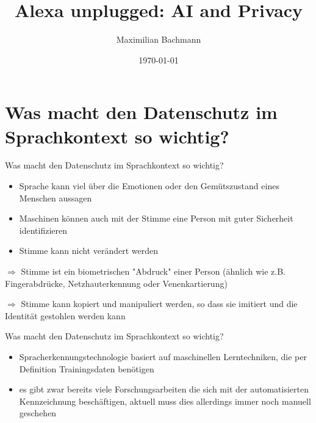 \documentclass[aspectratio=169]{beamer}
\title[Alexa unplugged: AI and Privacy]{Alexa unplugged: AI and Privacy}
\author{Maximilian Bachmann\\}
\date{\today}
\begin{document}
\begin{frame}
  \titlepage
\end{frame}





\section{Was macht den Datenschutz im Sprachkontext so wichtig?}
\begin{frame}{Was macht den Datenschutz im Sprachkontext so wichtig?}
\begin{itemize} 
	\item Sprache kann viel über die Emotionen oder den Gemütszustand eines Menschen aussagen
	\item Maschinen können auch mit der Stimme eine Person mit guter Sicherheit identifizieren
	\item Stimme kann nicht verändert werden
\end{itemize}
$\Rightarrow$ Stimme ist ein biometrischen "Abdruck" einer Person (ähnlich wie z.B. Fingerabdrücke, Netzhauterkennung oder Venenkartierung)

$\Rightarrow$ Stimme kann kopiert und manipuliert werden, so dass sie imitiert und die Identität gestohlen werden kann

\end{frame}

\begin{frame}{Was macht den Datenschutz im Sprachkontext so wichtig?}
	\begin{itemize} 
		\item Spracherkennungstechnologie basiert auf maschinellen Lerntechniken, die per Definition Trainingsdaten benötigen
		\item es gibt zwar bereits viele Forschungsarbeiten die sich mit der automatisierten Kennzeichnung beschäftigen, aktuell muss dies allerdings immer noch manuell geschehen
	\end{itemize}
\end{frame}
\end{document}

